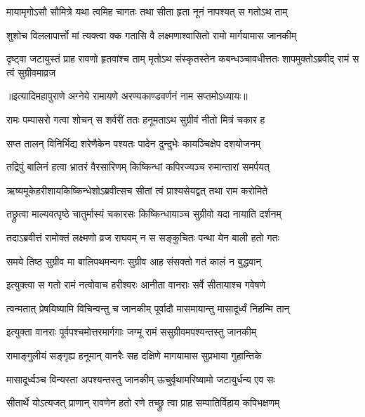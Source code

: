 \twolineshloka
{मायामृगोऽसौ सौमित्रे यथा त्वमिह चागतः }
{तथा सीता हृता नूनं नापश्यत् स गतोऽथ ताम्}%

\twolineshloka
{शुशोच विललापार्त्तो मां त्यक्त्वा क्क गतासि वै}
{लक्ष्मणाश्वासितो रामो मार्गयामास जानकीम्}%

\threelineshloka
{दृष्ट्वा जटायुस्तं प्राह रावणो हृतवांश्च ताम्}
{मृतोऽथ संस्कृतस्तेन कबन्धञ्चावधीत्ततः}
{शापमुक्तोऽब्रवीद् रामं स त्वं सुग्रीवमाव्रज} %

॥इत्यादिमहापुराणे अग्नेये रामायणे अरण्यकाण्डवर्णनं नाम सप्तमोऽध्यायः॥





\twolineshloka
{रामः पम्पासरो गत्वा शोचन् स शर्वरीं ततः}
{हनूमताऽथ सुग्रीवं नीतो मित्रं चकार ह}%

\twolineshloka
{सप्त तालन् विनिर्भिद्य शरेणैकेन पश्यतः}
{पादेन दुन्दुभेः कायञ्चिक्षेप दशयोजनम्}%

\twolineshloka
{तद्रिपुं बालिनं हत्वा भ्रातरं वैरसारिणम्}
{किष्किन्धां कपिरज्यञ्च रुमान्तारां समर्पयत्}%

\twolineshloka
{ऋष्यमूकेहरीशायकिष्किन्धेशोऽब्रवीत्सच }
{सीतां त्वं प्राश्यसेयद्वत् तथा राम करोमिते}%

\twolineshloka
{तछ्रुत्वा माल्यवत्पृष्ठे चातुर्मास्यं चकारसः}
{किष्किन्धायाञ्च सुग्रीवो यदा नायाति दर्शनम्}%

\twolineshloka
{तदाऽब्रवीत्तं रामोक्तं लक्ष्मणो व्रज राघवम्}
{न स सङ्कुचितः पन्था येन बाली हतो गतः}%

\twolineshloka
{समये तिष्ठ सुग्रीव मा बालिपथमन्वगः}
{सुग्रीव आह संसक्तो गतं कालं न बुद्धवान्}%

\twolineshloka
{इत्युक्त्वा स गतो रामं नत्वोवाच हरीश्वरः}
{आनीता वानराः सर्वे सीतायाश्च गवेषणे}%

\twolineshloka
{त्वन्मतात् प्रेषयिष्यामि विचिन्वन्तु च जानकीम् }
{पूर्वादौ मासमायान्तु मासादूर्ध्वं निहन्मि तान्}%

\twolineshloka
{इत्युक्ता वानराः पूर्वपश्चमोत्तरमार्गगाः}
{जग्मू रामं ससुग्रीवमपश्यन्तस्तु जानकीम्}%

\twolineshloka
{रामाङ्गुलीयं सङ्गृह्य हनूमान् वानरैः सह}
{दक्षिणे मागयामास सुप्रभाया गुहान्तिके}%

\twolineshloka
{मासादूर्ध्वञ्च विन्यस्ता अपश्यन्तस्तु जानकीम्}
{ऊचुर्वृथामरिष्यामो जटायुर्धन्य एव सः}%

\twolineshloka
{सीतार्थे योऽत्यजत् प्राणान् रावणेन हतो रणे}
{तच्छ्रु त्वा प्राह सम्पातिर्विहाय कपिभक्षणम्}%

